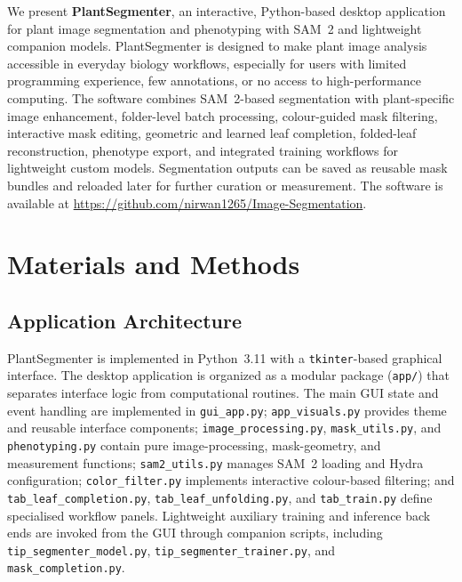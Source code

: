 \documentclass[12pt, a4paper]{article}
\begin{document}
We present \textbf{PlantSegmenter}, an interactive, Python-based desktop application for plant image segmentation and phenotyping with SAM~2 and lightweight companion models. PlantSegmenter is designed to make plant image analysis accessible in everyday biology workflows, especially for users with limited programming experience, few annotations, or no access to high-performance computing. The software combines SAM~2-based segmentation with plant-specific image enhancement, folder-level batch processing, colour-guided mask filtering, interactive mask editing, geometric and learned leaf completion, folded-leaf reconstruction, phenotype export, and integrated training workflows for lightweight custom models. Segmentation outputs can be saved as reusable mask bundles and reloaded later for further curation or measurement. The software is available at \url{https://github.com/nirwan1265/Image-Segmentation}.



\section{Materials and Methods}
\label{sec:methods}

\subsection{Application Architecture}

PlantSegmenter is implemented in Python~3.11 with a \texttt{tkinter}-based graphical interface. The desktop application is organized as a modular package (\texttt{app/}) that separates interface logic from computational routines. The main GUI state and event handling are implemented in \texttt{gui\_app.py}; \texttt{app\_visuals.py} provides theme and reusable interface components; \texttt{image\_processing.py}, \texttt{mask\_utils.py}, and \texttt{phenotyping.py} contain pure image-processing, mask-geometry, and measurement functions; \texttt{sam2\_utils.py} manages SAM~2 loading and Hydra configuration; \texttt{color\_filter.py} implements interactive colour-based filtering; and \texttt{tab\_leaf\_completion.py}, \texttt{tab\_leaf\_unfolding.py}, and \texttt{tab\_train.py} define specialised workflow panels. Lightweight auxiliary training and inference back ends are invoked from the GUI through companion scripts, including \texttt{tip\_segmenter\_model.py}, \texttt{tip\_segmenter\_trainer.py}, and \texttt{mask\_completion.py}.
\end{document}
